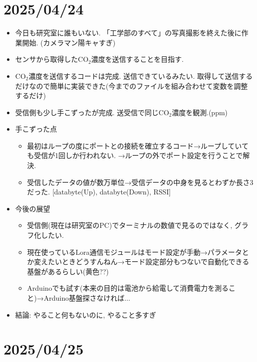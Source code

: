 \documentclass[11pt,a4paper,uplatex]{jsarticle}
\begin{document}
\section{2025/04/24}
\begin{itemize}
    \item 今日も研究室に誰もいない. 「工学部のすべて」の写真撮影を終えた後に作業開始. (カメラマン陽キャすぎ)
    \item センサから取得したCO$_2$濃度を送信することを目指す.
    \item CO$_2$濃度を送信するコードは完成. 送信できているみたい. 取得して送信するだけなので簡単に実装できた(今までのファイルを組み合わせて変数を調整するだけ)
    \item 受信側も少し手こずったが完成. 送受信で同じCO$_2$濃度を観測.(ppm)
    \item 手こずった点
    \begin{itemize}
        \item 最初はループの度にポートとの接続を確立するコード→ループしていても受信が1回しか行われない. →ループの外でポート設定を行うことで解決.
        \item 受信したデータの値が数万単位→受信データの中身を見るとわずか長さ3だった. [databyte(Up), databyte(Down), RSSI]
    \end{itemize}
    \item 今後の展望
    \begin{itemize}
        \item 受信側(現在は研究室のPC)でターミナルの数値で見るのではなく, グラフ化したい.
        \item 現在使っているLora通信モジュールはモード設定が手動→パラメータとか変えたいときどうすんねん→モード設定部分もつないで自動化できる基盤があるらしい(黄色??)
        \item Arduinoでも試す(本来の目的は電池から給電して消費電力を測ること)→Arduino基盤探さなければ$\dots$
    \end{itemize}
    \item 結論: やること何もないのに, やること多すぎ
\end{itemize}


\section{2025/04/25}
    
\end{document}

